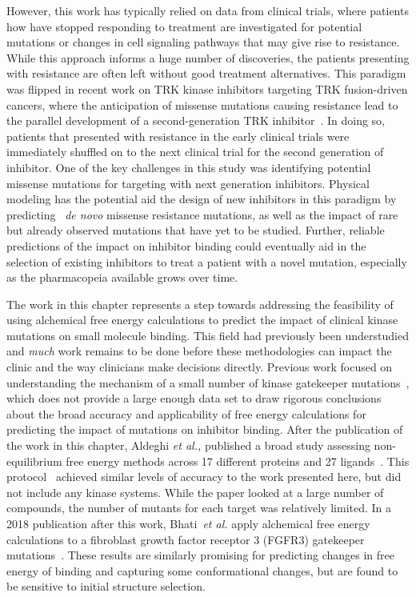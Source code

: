 \documentclass[phd,tocprelim]{cornell}
\begin{document}
However, this work has typically relied on data from clinical trials, where patients how have stopped responding to treatment are investigated for potential mutations or changes in cell signaling pathways that may give rise to resistance. While this approach informs a huge number of discoveries, the patients presenting with resistance are often left without good treatment alternatives. This paradigm was flipped in recent work on TRK kinase inhibitors targeting TRK fusion-driven cancers, where the anticipation of missense mutations causing resistance lead to the parallel development of a second-generation TRK inhibitor~\citep{Drilon:2017gb}. In doing so, patients that presented with resistance in the early clinical trials were immediately shuffled on to the next clinical trial for the second generation of inhibitor. One of the key challenges in this study was identifying potential missense mutations for targeting with next generation inhibitors. Physical modeling has the potential aid the design of new inhibitors in this paradigm by predicting ~\emph{de novo} missense resistance mutations, as well as the impact of rare but already observed mutations that have yet to be studied. Further, reliable predictions of the impact on inhibitor binding could eventually aid in the selection of existing inhibitors to treat a patient with a novel mutation, especially as the pharmacopeia available grows over time. 

The work in this chapter represents a step towards addressing the feasibility of using alchemical free energy calculations to predict the impact of clinical kinase mutations on small molecule binding. This field had previously been understudied and \emph{much} work remains to be done before these methodologies can impact the clinic and the way clinicians make decisions directly. Previous work focused on understanding the mechanism of a small number of kinase gatekeeper mutations~\citep{Mondal:2016ju}, which does not provide a large enough data set to draw rigorous conclusions about the broad accuracy and applicability of free energy calculations for predicting the impact of mutations on inhibitor binding. After the publication of the work in this chapter, Aldeghi \emph{et al.,} published a broad study assessing non-equilibrium free energy methods across 17 different proteins and 27 ligands~\citep{Aldeghi:2018fz}. 
This protocol~\citep{Aldeghi:2018ej} achieved similar levels of accuracy to the work presented here, but did not include any kinase systems. While the paper looked at a large number of compounds, the number of mutants for each target was relatively limited. In a 2018 publication after this work, Bhati~\emph{et al.} apply alchemical free energy calculations to a fibroblast growth factor receptor 3 (FGFR3) gatekeeper mutations~\citep{Bhati:2018dl}. These results are similarly promising for predicting changes in free energy of binding and capturing some conformational changes, but are found to be sensitive to initial structure selection. 
\end{document}
